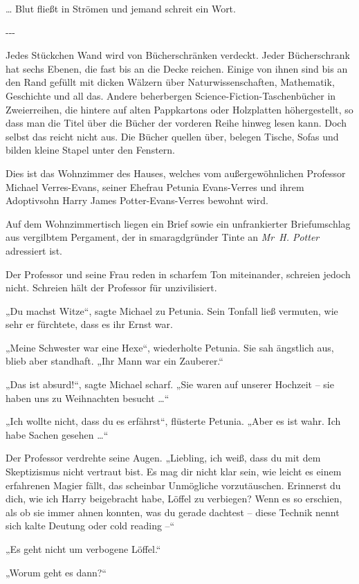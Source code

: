 {{… Blut fließt in Strömen und jemand schreit ein Wort.}

-\/-\/-

Jedes Stückchen Wand wird von Bücherschränken verdeckt. Jeder Bücherschrank hat sechs Ebenen, die fast bis an die Decke reichen. Einige von ihnen sind bis an den Rand gefüllt mit dicken Wälzern über Naturwissenschaften, Mathematik, Geschichte und all das. Andere beherbergen Science-Fiction-Taschenbücher in Zweierreihen, die hintere auf alten Pappkartons oder Holzplatten höhergestellt, so dass man die Titel über die Bücher der vorderen Reihe hinweg lesen kann. Doch selbst das reicht nicht aus. Die Bücher quellen über, belegen Tische, Sofas und bilden kleine Stapel unter den Fenstern.

Dies ist das Wohnzimmer des Hauses, welches vom außergewöhnlichen Professor Michael Verres-Evans, seiner Ehefrau Petunia Evans-Verres und ihrem Adoptivsohn Harry James Potter-Evans-Verres bewohnt wird.

Auf dem Wohnzimmertisch liegen ein Brief sowie ein unfrankierter Briefumschlag aus vergilbtem Pergament, der in smaragdgründer Tinte an \emph{Mr~H. Potter} adressiert ist.

Der Professor und seine Frau reden in scharfem Ton miteinander, schreien jedoch nicht. Schreien hält der Professor für unzivilisiert.

„Du machst Witze“, sagte Michael zu Petunia. Sein Tonfall ließ vermuten, wie sehr er fürchtete, dass es ihr Ernst war.

„Meine Schwester war eine Hexe“, wiederholte Petunia. Sie sah ängstlich aus, blieb aber standhaft. „Ihr Mann war ein Zauberer.“

„Das ist absurd!“, sagte Michael scharf. „Sie waren auf unserer Hochzeit -- sie haben uns zu Weihnachten besucht …“

„Ich wollte nicht, dass du es erfährst“, flüsterte Petunia. „Aber es ist wahr. Ich habe Sachen gesehen …“

Der Professor verdrehte seine Augen. „Liebling, ich weiß, dass du mit dem Skeptizismus nicht vertraut bist. Es mag dir nicht klar sein, wie leicht es einem erfahrenen Magier fällt, das scheinbar Unmögliche vorzutäuschen. Erinnerst du dich, wie ich Harry beigebracht habe, Löffel zu verbiegen? Wenn es so erschien, als ob sie immer ahnen konnten, was du gerade dachtest -- diese Technik nennt sich kalte Deutung oder cold reading --“

„Es geht nicht um verbogene Löffel.“

„Worum geht es dann?“

}
